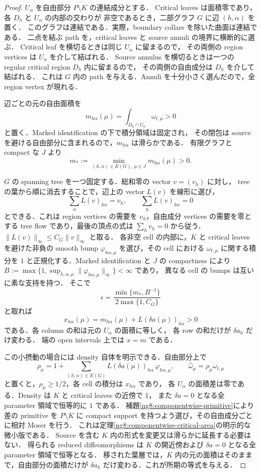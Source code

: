 \begin{proof}
$U_\alpha$ を自由部分 $P\setminus K$ の連結成分とする．
Critical leaves は面積零であり，各 $D_h$ と $U_\alpha$ の内部の交わりが
非空であるとき，二部グラフ $G$ に辺 $(h,\alpha)$ を置く．
このグラフは連結である．実際，boundary collars を除いた曲面は連結である．
二点を結ぶ path を，critical leaves と source annuli の境界に横断的に選ぶ．
Critical leaf を横切るときは同じ $U_\alpha$ に留まるので，
その両側の region vertices は $U_\alpha$ を介して結ばれる．
Source annulus を横切るときは一つの regular critical region $D_h$ 内に留まるので，
その両側の自由成分は $D_h$ を介して結ばれる．
これは $G$ 内の path を与える．Annuli を十分小さく選んだので，全 region vertex が現れる．

辺ごとの元の自由面積を
\[
 m_{h\alpha}(\mu)=
 \int_{D_h\cap U_\alpha}\omega_{t,\mu}>0
\]
と置く．Marked identification の下で積分領域は固定され，
その閉包は source を避ける自由部分に含まれるので，$m_{h\alpha}$ は滑らかである．
有限グラフと compact な $J$ より
\[
 m_*:=\min_{(h,\alpha)\in E(G),\,\mu\in J}m_{h\alpha}(\mu)>0.
\]

$G$ の spanning tree を一つ固定する．総和零の vector $v=(v_h)$ に対し，
tree の葉から順に消去することで，辺上の vector $L(v)$ を線形に選び，
\[
 \sum_\alpha L(v)_{h\alpha}=v_h,
 \qquad \sum_h L(v)_{h\alpha}=0
\]
とできる．これは region vertices の需要を $v_h$，自由成分 vertices の需要を零とする
tree flow であり，最後の頂点の式は $\sum_hv_h=0$ から従う．
$\|L(v)\|_\infty\le C_G\|v\|_\infty$ と取る．
各非空 cell の内部に，$K$ と critical leaves を避けた非負の smooth bump
$\varphi_{h\alpha,\mu}$ を選び，その cell における $\omega_{t,\mu}$ に関する積分を
$1$ と正規化する．Marked identification と $J$ の compactness により
$B:=\max\{1,\sup_{h,\alpha,\mu}\|\varphi_{h\alpha,\mu}\|_\infty\}<\infty$ であり，
異なる cell の bumps は互いに素な支持を持つ．
そこで
\[
 \epsilon=\frac{\min\{m_*,B^{-1}\}}{2\max\{1,C_G\}}
\]
と取れば
\[
 x_{h\alpha}(\mu)=m_{h\alpha}(\mu)+L(\delta a(\mu))_{h\alpha}>0
\]
である．各 column の和は元の $U_\alpha$ の面積に等しく，
各 row の和だけが $\delta a_h$ だけ変わる．
端の open intervals 上では $x=m$ である．

この小摂動の場合には density 自体を明示できる．自由部分上で
\[
 \rho_\mu=1+\sum_{(h,\alpha)\in E(G)}
 L(\delta a(\mu))_{h\alpha}\,\varphi_{h\alpha,\mu},
 \qquad \widehat\omega_\mu=\rho_\mu\omega_{t,\mu}
\]
と置くと，$\rho_\mu\ge1/2$，各 cell の積分は $x_{h\alpha}$ であり，
各 $U_\alpha$ の面積差は零である．Density は $K$ と critical leaves の近傍で $1$，
また $\delta a=0$ となる全 parameter 領域で恒等的に $1$ である．
補題\ref{ng8:componentwise-primitive}により差の primitive を
$P\setminus K$ に compact support を持つよう選び，その自由成分ごとに相対 Moser を行う．
これは定理\ref{ng8:componentwise-critical-area}の明示的な微小版である．
Source を含む $K$ 内の形式を変更又は滑らかに延長する必要はない．
得られる reduced diffeomorphisms は $K$ の開近傍および
$\delta a=0$ となる全 parameter 領域で恒等となる．
移された葉層では，$K$ 内の元の面積はそのままで，自由部分の面積だけが
$\delta a_h$ だけ変わる．これが所期の等式を与える．


\end{proof}
